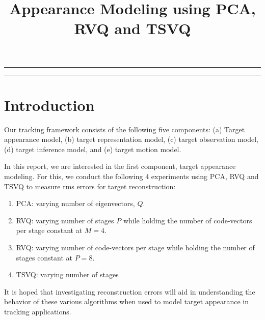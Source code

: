 
\title{Appearance Modeling using PCA, RVQ and TSVQ}
\date{}

\maketitle
\rule[0pt]{\textwidth}{1pt}
\tableofcontents
\rule[0pt]{\textwidth}{1pt}

\section{Introduction}
Our tracking framework consists of the following five components: (a) Target appearance model, (b) target representation model, (c) target observation model, (d) target inference model, and (e) target motion model.

In this report, we are interested in the first component, target appearance modeling.  For this, we conduct the following 4 experiments using PCA, RVQ and TSVQ to measure rms errors for target reconstruction:

\begin{enumerate}
\item PCA: varying number of eigenvectors, $Q$.
\item RVQ: varying number of stages $P$ while holding the number of code-vectors per stage constant at $M=4$.
\item RVQ: varying number of code-vectors per stage while holding the number of stages constant at $P=8$.
\item TSVQ: varying number of stages
\end{enumerate}

It is hoped that investigating reconstruction errors will aid in understanding the behavior of these various algorithms when used to model target appearance in tracking applications.


